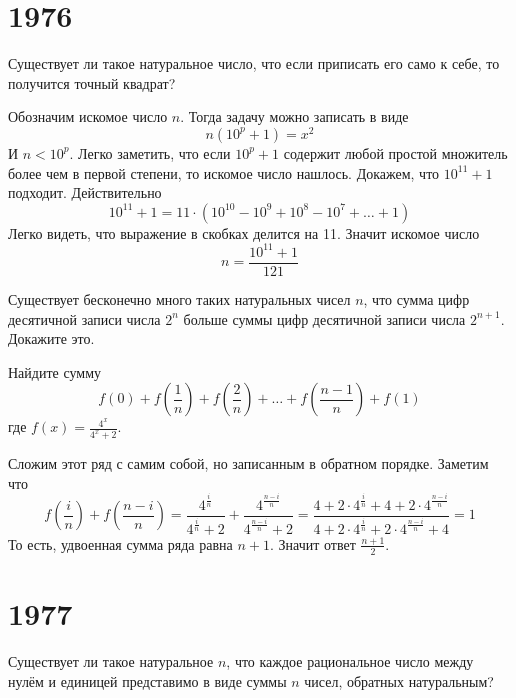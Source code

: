 \documentclass[11pt, a4paper]{common/document_template}
\begin{document}
\chapter{1976}

\begin{exercise}[387]
Существует ли такое натуральное число, что если приписать его само к себе, то получится точный квадрат? 
\end{exercise}

\begin{Solution}
Обозначим искомое число $n$. Тогда задачу можно записать в виде
$$
n(10^{p}+1) = x^{2}
$$
И $n < 10^{p}$. Легко заметить, что если $10^{p} + 1$ содержит любой простой множитель более чем в первой степени, то искомое число нашлось. Докажем, что $10^{11}+1$ подходит. Действительно
$$
10^{11}+1 = 11 \cdot (10^{10} - 10^{9} + 10^{8} - 10^{7} + \dots + 1)
$$
Легко видеть, что выражение в скобках делится на 11. Значит искомое число
$$
n = \frac{10^{11} + 1}{121}
$$ 
\end{Solution}

\begin{exercise}[390]
Существует бесконечно много таких натуральных чисел $n$, что сумма цифр десятичной записи числа $2^{n}$ больше суммы цифр десятичной записи числа $2^{n+1}$. Докажите это.
\end{exercise}

\begin{exercise}[393]
Найдите сумму
$$
f(0) + f\left(\frac{1}{n}\right) + f\left(\frac{2}{n}\right) + \dots + f\left(\frac{n-1}{n}\right)+ f(1) 
$$
где $f(x) = \frac{4^{x}}{4^{x}+2}$.
\end{exercise}

\begin{Solution}
Сложим этот ряд с самим собой, но записанным в обратном порядке. Заметим что
$$
f\left(\frac{i}{n}\right) + f\left(\frac{n-i}{n}\right) = \frac{4^{\frac{i}{n}}}{4^{\frac{i}{n}}+2} + \frac{4^{\frac{n-i}{n}}}{4^{\frac{n-i}{n}}+2} = \frac{4 + 2 \cdot 4^{\frac{i}{n}} + 4 + 2 \cdot 4^{\frac{n-i}{n}}}{4 + 2 \cdot 4^{\frac{i}{n}} + 2 \cdot 4^{\frac{n-i}{n}} + 4} = 1
$$
То есть, удвоенная сумма ряда равна $n + 1$. Значит ответ $\frac{n+1}{2}$.
\end{Solution}

\chapter{1977}

\begin{exercise}[425]
Существует ли такое натуральное $n$, что каждое рациональное число между нулём и единицей представимо в виде суммы $n$ чисел, обратных натуральным?
\end{exercise}
\end{document}
